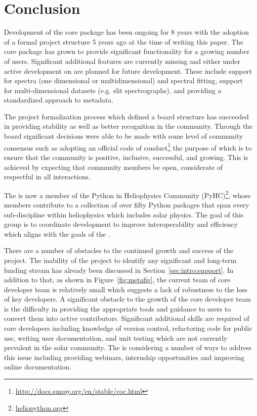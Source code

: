 \section{Conclusion}
\label{sec:conclusion}
Development of the \sunpypkg core package has been ongoing for 8 years with the adoption of a formal project structure 5 years ago at the time of writing this paper.
The core package has grown to provide significant functionality for a growing number of users.
Significant additional features are currently missing and either under active development on are planned for future development.
These include support for spectra (one dimensional or multidimensional) and spectral fitting, support for multi-dimensional datasets (e.g. slit spectrographs), and providing a standardized approach to metadata.

The project formalization process which defined a board structure has succeeded in providing stability as well as better recognition in the community.
Through the board significant decisions were able to be made with some level of community consensus such as adopting an official code of conduct\footnote{\url{http://docs.sunpy.org/en/stable/coc.html}} the purpose of which is to ensure that the \sunpy community is positive, inclusive, successful, and growing.
This is achieved by expecting that community members be open, considerate of respectful in all interactions.

The \sunpyproj is now a member of the Python in Heliophysics Community (PyHC)\footnote{\url{heliopython.org}}, whose members contribute to a collection of over fifty Python packages that span every sub-discipline within heliophysics which includes solar physics. The goal of this group is to coordinate \python development to improve interoperability and efficiency which aligns with the goals of the  \sunpyproj.

There are a number of obstacles to the continued growth and success of the project. The inability of the project to identify any significant and long-term funding stream has already been discussed in Section~\ref{sec:intro:support}. In addition to that, as shown in Figure~\ref{fig:metafig}, the current team of core developer team is relatively small which suggests a lack of robustness to the loss of key developers. 
A significant obstacle to the growth of the core developer team is the difficulty in providing the appropriate tools and guidance to users to convert them into active contributors.
Significant additional skills are required of core developers including knowledge of version control,  refactoring code for public use, writing user documentation, and unit testing which are not currently prevalent in the solar community.
The \sunpyproj is considering a number of ways to address this issue including providing webinars, internship opportunities and improving online documentation.

